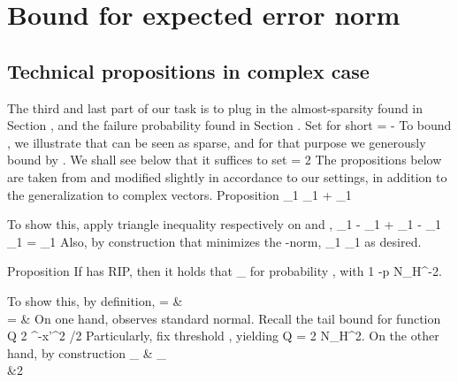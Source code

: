 \section {Bound for expected error norm}

\subsection {Technical propositions in complex case}

The third and last part of our task is to plug in the almost-sparsity found in Section , and the failure probability found in Section .
Set for short
%
 {
=  -  
}
%
To bound , we illustrate that  can be seen as sparse, and for that purpose we generously bound  by .
We shall see below that it suffices to set
%
 {
\g
= 2  
}
%
The propositions below are taken from \cite {CaT07} and modified slightly in accordance to our settings, in addition to the generalization to complex vectors.
%
\Result
{Proposition}
{
%
 {
 _1
\leq {} _1
+ _1 
}
}

To show this, apply triangle inequality respectively on  and ,
%
 {
 _1
-  _1
+  _1
-  _1
\leq {} _1
%
= _1 
}
%
Also, by construction that  minimizes the -norm,
%
 {
 _1
\leq {} _1 
}
as desired.

%
\Result
{Proposition}
{
If  has  RIP, then it holds that
%
 {
 _\infty
{}  
}
%
for probability , with
%
 {
1 -p
\leq N_H^{-2}. 
}
}

To show this, by definition,
%
 {
= & \notag \\
%
= & 
}
%
On one hand,  observes standard normal.
Recall the tail bound for  function
%
 {
Q
\leq {} {2} ^{-x'^2 /2} 
}
%
Particularly, fix threshold , yielding
%
 {
Q
= {2 N_H^2}. 
}
%
On the other hand, by construction
%
 {
 _\infty
\leq & _\infty \notag \\
%
\leq &2 
}

